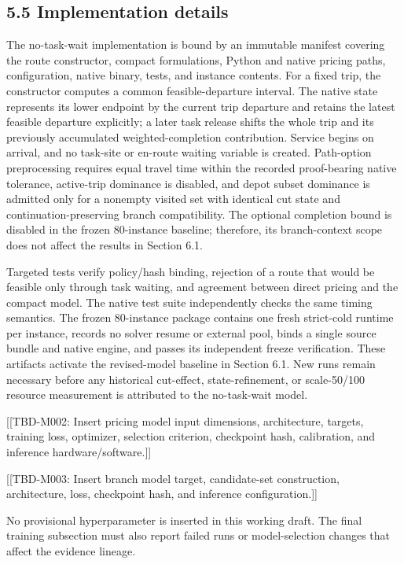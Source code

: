 \documentclass[
  11pt,
]{article}
\begin{document}
\hypertarget{implementation-details}{%
\subsection{5.5 Implementation details}\label{implementation-details}}

The no-task-wait implementation is bound by an immutable manifest
covering the route constructor, compact formulations, Python and native
pricing paths, configuration, native binary, tests, and instance
contents. For a fixed trip, the constructor computes a common
feasible-departure interval. The native state represents its lower
endpoint by the current trip departure and retains the latest feasible
departure explicitly; a later task release shifts the whole trip and its
previously accumulated weighted-completion contribution. Service begins
on arrival, and no task-site or en-route waiting variable is created.
Path-option preprocessing requires equal travel time within the recorded
proof-bearing native tolerance, active-trip dominance is disabled, and
depot subset dominance is admitted only for a nonempty visited set with
identical cut state and continuation-preserving branch compatibility.
The optional completion bound is disabled in the frozen 80-instance
baseline; therefore, its branch-context scope does not affect the
results in Section 6.1.

Targeted tests verify policy/hash binding, rejection of a route that
would be feasible only through task waiting, and agreement between
direct pricing and the compact model. The native test suite
independently checks the same timing semantics. The frozen 80-instance
package contains one fresh strict-cold runtime per instance, records no
solver resume or external pool, binds a single source bundle and native
engine, and passes its independent freeze verification. These artifacts
activate the revised-model baseline in Section 6.1. New runs remain
necessary before any historical cut-effect, state-refinement, or
scale-50/100 resource measurement is attributed to the no-task-wait
model.

{[}{[}TBD-M002: Insert pricing model input dimensions, architecture,
targets, training loss, optimizer, selection criterion, checkpoint hash,
calibration, and inference hardware/software.{]}{]}

{[}{[}TBD-M003: Insert branch model target, candidate-set construction,
architecture, loss, checkpoint hash, and inference configuration.{]}{]}

No provisional hyperparameter is inserted in this working draft. The
final training subsection must also report failed runs or
model-selection changes that affect the evidence lineage.
\end{document}
